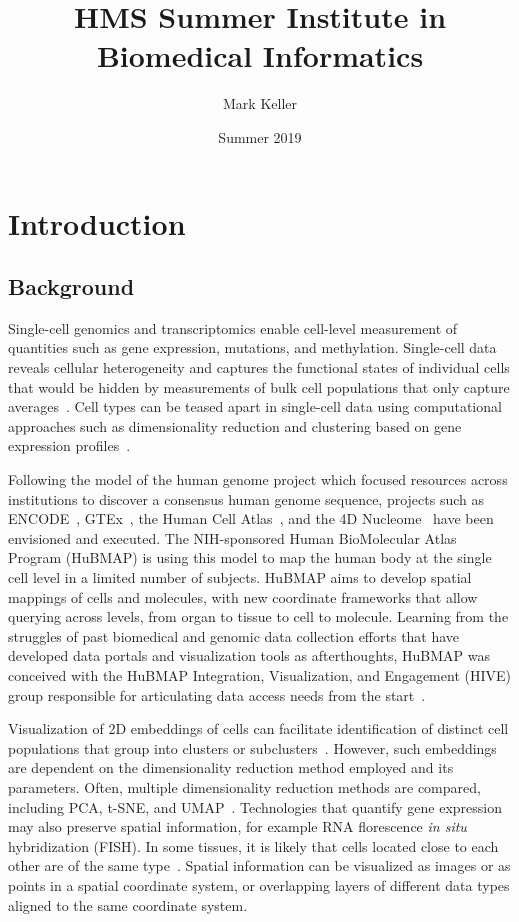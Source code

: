 \documentclass[12pt, letterpaper]{article}
\title{HMS Summer Institute in Biomedical Informatics}
\author{Mark Keller}
\date{Summer 2019}
\begin{document}
\maketitle

\section{Introduction}
\subsection{Background}
Single-cell genomics and transcriptomics enable cell-level measurement of quantities such as gene expression, mutations, and methylation.
Single-cell data reveals cellular heterogeneity and captures the functional states of individual cells that would be hidden by measurements of bulk cell populations that only capture averages~\cite{shapiro2013single,nathan2019multimodal}.
Cell types can be teased apart in single-cell data using computational approaches such as dimensionality reduction and clustering based on gene expression profiles~\cite{stegle2015computational,burgess2019spatial}.

Following the model of the human genome project which focused resources across institutions to discover a consensus human genome sequence, projects such as ENCODE~\cite{encode2004encode}, GTEx~\cite{lonsdale2013genotype}, the Human Cell Atlas~\cite{regev2017science}, and the 4D Nucleome~\cite{dekker20174d} have been envisioned and executed.
The NIH-sponsored Human BioMolecular Atlas Program (HuBMAP) is using this model to map the human body at the single cell level in a limited number of subjects.
HuBMAP aims to develop spatial mappings of cells and molecules, with new coordinate frameworks that allow querying across levels, from organ to tissue to cell to molecule.
Learning from the struggles of past biomedical and genomic data collection efforts that have developed data portals and visualization tools as afterthoughts, HuBMAP was conceived with the HuBMAP Integration, Visualization, and Engagement (HIVE) group responsible for articulating data access needs from the start~\cite{snyder2019mapping}.

Visualization of 2D embeddings of cells can facilitate identification of distinct cell populations that group into clusters or subclusters~\cite{wang2017visualization,staahl2016visualization}.
However, such embeddings are dependent on the dimensionality reduction method employed and its parameters.
Often, multiple dimensionality reduction methods are compared, including PCA, t-SNE, and UMAP~\cite{ovchinnikova2019exploring,becht2019dimensionality}.
Technologies that quantify gene expression may also preserve spatial information, for example RNA florescence \textit{in situ} hybridization (FISH).
In some tissues, it is likely that cells located close to each other are of the same type~\cite{stegle2015computational}.
Spatial information can be visualized as images or as points in a spatial coordinate system, or overlapping layers of different data types aligned to the same coordinate system.
\end{document}
